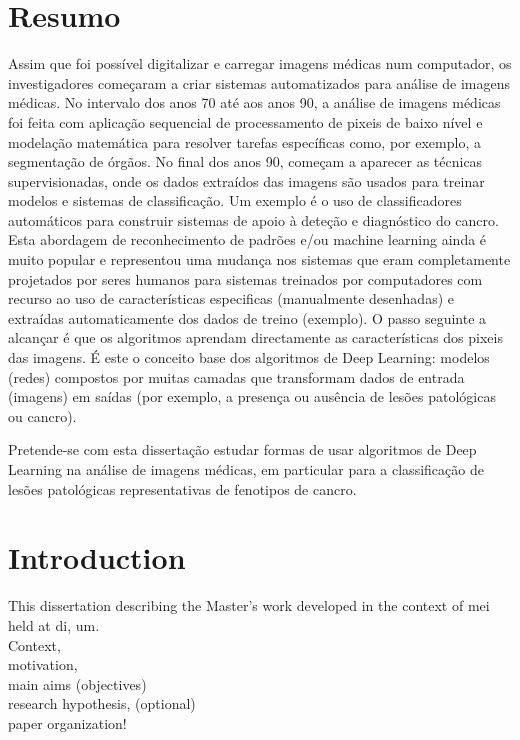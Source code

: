 \documentclass[
  oneside,
  11pt, a4paper,
  footinclude=true,
  headinclude=true,
  cleardoublepage=empty
]{scrbook}
\begin{document}
  \chapter*{Resumo}
    Assim que foi possível digitalizar e carregar imagens médicas num computador, os investigadores começaram a criar sistemas automatizados para análise de imagens médicas. No intervalo dos anos 70 até aos anos 90, a análise de imagens médicas foi feita com aplicação sequencial de processamento de pixeis de baixo nível e modelação matemática para resolver tarefas específicas como, por exemplo, a segmentação de órgãos. No final dos anos 90, começam a aparecer as técnicas supervisionadas, onde os dados extraídos das imagens são usados para treinar modelos e sistemas de classificação. Um exemplo é o uso de classificadores automáticos para construir sistemas de apoio à deteção e diagnóstico do cancro. Esta abordagem de reconhecimento de padrões e/ou machine learning ainda é muito popular e representou uma mudança nos sistemas que eram completamente projetados por seres humanos para sistemas treinados por computadores com recurso ao uso de características especificas (manualmente desenhadas) e extraídas automaticamente dos dados de treino (exemplo). O passo seguinte a alcançar é que os algoritmos aprendam directamente as características dos pixeis das imagens. É este o conceito base dos algoritmos de Deep Learning: modelos (redes) compostos por muitas camadas que transformam dados de entrada (imagens) em saídas (por exemplo, a presença ou ausência de lesões patológicas ou cancro).

    Pretende-se com esta dissertação estudar formas de usar algoritmos de Deep Learning na análise de imagens médicas, em particular para a classificação de lesões patológicas representativas de fenotipos de cancro.

  \tableofcontents
  \listoffigures
  \listoftables
  \printglossary[type=\acronymtype]
  \clearpage
  \thispagestyle{empty}


  \chapter{Introduction}
    This dissertation describing the  Master's work developed in the context of
    \gls{mei} held at \gls{di}, \gls{um}.\\
    Context,\\ motivation,\\ main aims	(objectives) \\ research hypothesis, (optional) \\ paper organization!
\end{document}
